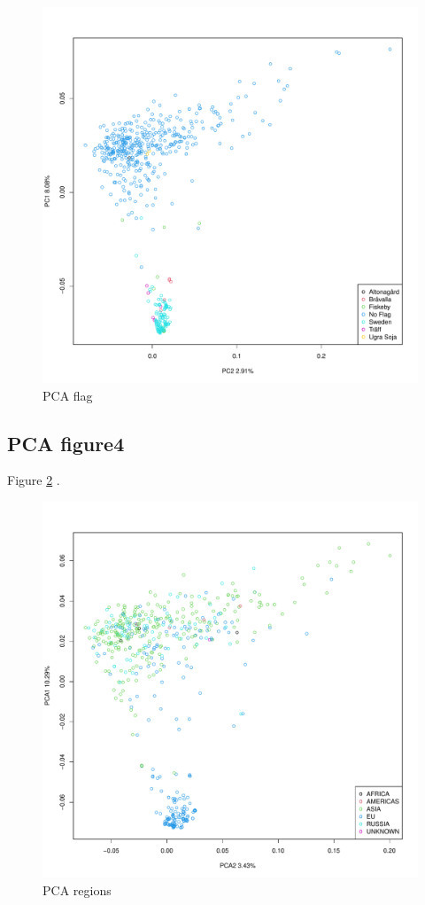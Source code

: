 \documentclass[9pt, onecolumn,twoside]{gsajnl}
\begin{document}
\begin{figure}[t]
\centering
\includegraphics[width=\linewidth]{plot_PCA_flag.pdf}
\caption{PCA flag}
\label{fig:pca3}
\end{figure}



\subsection{PCA figure4}


Figure \ref{fig:pca4} .

\begin{figure}[t]
\centering
\includegraphics[width=\linewidth]{plot_PCA_region2.pdf}
\caption{PCA regions}
\label{fig:pca4}
\end{figure}
\end{document}
